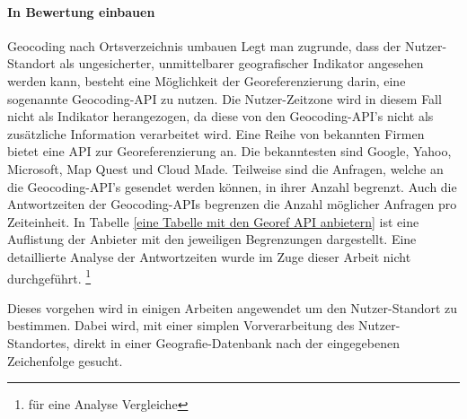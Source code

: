 	\paragraph{In Bewertung einbauen} 
	Geocoding nach Ortsverzeichnis umbauen
	Legt man zugrunde, dass der Nutzer-Standort als ungesicherter, unmittelbarer geografischer Indikator angesehen werden kann, besteht eine Möglichkeit der Georeferenzierung darin, eine sogenannte Geocoding-API zu nutzen.
	Die Nutzer-Zeitzone wird in diesem Fall nicht als Indikator herangezogen, da diese von den Geocoding-API's nicht als zusätzliche Information verarbeitet wird. 
	Eine Reihe von bekannten Firmen bietet eine API zur Georeferenzierung an. 
	Die bekanntesten sind Google, Yahoo, Microsoft, Map Quest und Cloud Made. 
	Teilweise sind die Anfragen, welche an die Geocoding-API's gesendet werden können, in ihrer Anzahl begrenzt.
	Auch die Antwortzeiten der Geocoding-APIs begrenzen die Anzahl möglicher Anfragen pro Zeiteinheit. 
	In Tabelle \ref{eine Tabelle mit den Georef API anbietern} ist eine Auflistung der Anbieter mit den jeweiligen Begrenzungen dargestellt.
	Eine detaillierte Analyse der Antwortzeiten wurde im Zuge dieser Arbeit nicht durchgeführt.  \footnote{für eine Analyse Vergleiche} 


	
	Dieses vorgehen wird in einigen Arbeiten angewendet um den Nutzer-Standort zu bestimmen. 
	Dabei wird, mit einer simplen Vorverarbeitung des Nutzer-Standortes, direkt in einer Geografie-Datenbank nach der eingegebenen Zeichenfolge gesucht. 
